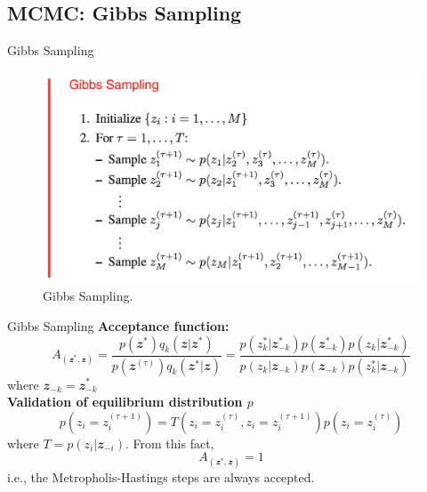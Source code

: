 \documentclass{bredelebeamer}
\begin{document}
\subsection{MCMC: Gibbs Sampling}
\begin{frame}{Gibbs Sampling}
  \begin{figure}
  \centering
  \includegraphics[scale=0.45]{gibbs_sampling.png}
  \caption{
    Gibbs Sampling.
  }
  \end{figure}
\end{frame}

\begin{frame}{Gibbs Sampling}
  \textbf{Acceptance function:}
  \begin{equation}
    A_(\mathbfit{z}^{*}, \mathbfit{z})
    =
      \frac{p(\mathbfit{z}^{*}) q_k(\mathbfit{z}|\mathbfit{z}^{*})}
      {p(\mathbfit{z}^{(\tau)}) q_k(\mathbfit{z}^{*}|\mathbfit{z})}
    =
    \frac{p(z_k^{*}|\mathbfit{z}_{-k}^{*}) p(\mathbfit{z}_{-k}^{*}) p(z_k|\mathbfit{z}_{-k}^{*})}
    {p(z_k|\mathbfit{z}_{-k}) p(\mathbfit{z}_{-k}) p(z_k^{*}|\mathbfit{z}_{-k})}
  \end{equation}
  where $\mathbfit{z}_{-k} = \mathbfit{z}^{*}_{-k}$
  \\[1.0\baselineskip]

  \textbf{Validation of equilibrium distribution $p$}
  \begin{equation}
    p(z_i = z_i^{(\tau + 1)}) = T(z_i = z_i^{(\tau)}, z_i = z_i^{(\tau + 1)}) p(z_i = z_i^{(\tau)})
  \end{equation}
  where $T = p(z_i|\mathbfit{z}_{-i})$. From this fact,
  \begin{equation}
    A_(\mathbfit{z}^{*}, \mathbfit{z}) = 1
  \end{equation}
  i.e., the Metropholis-Hastings steps are always accepted.
\end{frame}
\end{document}
